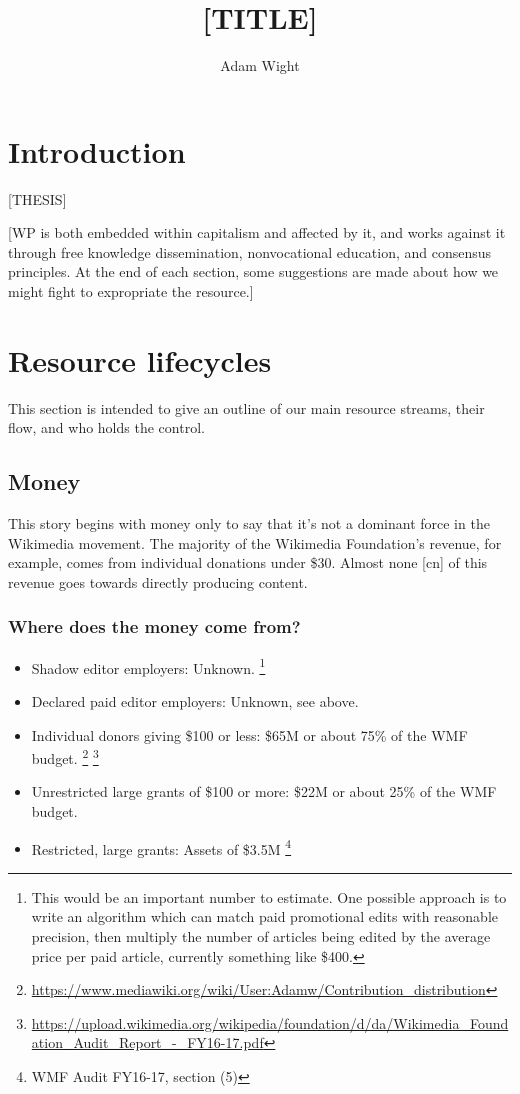 \documentclass[format=sigconf, authorversion]{acmart}
\title{[TITLE]}
\author{Adam Wight}
\affiliation{Wikimedia Foundation}
\begin{document}
\maketitle
\section{Introduction}

[THESIS]

[WP is both embedded within capitalism and affected by it, and works against it through free knowledge dissemination, nonvocational education, and consensus principles.  At the end of each section, some suggestions are made about how we might fight to expropriate the resource.]

\section{Resource lifecycles}

This section is intended to give an outline of our main resource streams, their flow, and who holds the control.

\subsection{Money}

This story begins with money only to say that it's not a dominant force in the Wikimedia movement.  The majority of the Wikimedia Foundation's revenue, for example, comes from individual donations under \$30.  Almost none [cn] of this revenue goes towards directly producing content.

\subsubsection{Where does the money come from?}

\begin{itemize}
\item Shadow editor employers: Unknown.
\footnote{This would be an important number to estimate.  One possible approach is to write an algorithm which can match paid promotional edits with reasonable precision, then multiply the number of articles being edited by the average price per paid article, currently something like \$400.}
\item Declared paid editor employers: Unknown, see above.
\item Individual donors giving \$100 or less: \$65M or about 75\% of the WMF budget.
\footnote{\url{https://www.mediawiki.org/wiki/User:Adamw/Contribution_distribution}}
\footnote{\label{wmfaudit}\url{https://upload.wikimedia.org/wikipedia/foundation/d/da/Wikimedia_Foundation_Audit_Report_-_FY16-17.pdf}}
\item Unrestricted large grants of \$100 or more: \$22M or about 25\% of the WMF budget.
\item Restricted, large grants: Assets of \$3.5M
\footnote{WMF Audit FY16-17, section (5)}
\end{itemize}
\end{document}
